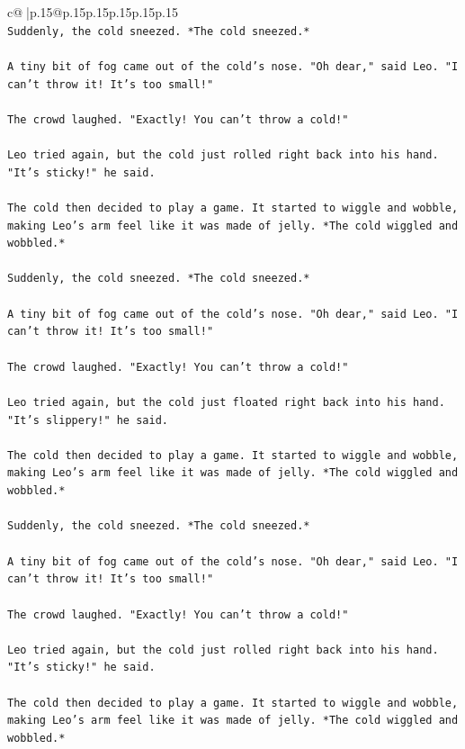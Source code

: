 \documentclass{article}
\begin{document}
{\begin{supertabular}{c@{$\;$}|p{.15\linewidth}@{}p{.15\linewidth}p{.15\linewidth}p{.15\linewidth}p{.15\linewidth}p{.15\linewidth}}
{{{\\ 
\texttt{Suddenly, the cold sneezed. *The cold sneezed.*} \\
\\ 
\texttt{A tiny bit of fog came out of the cold's nose. "Oh dear," said Leo. "I can't throw it! It's too small!"} \\
\\ 
\texttt{The crowd laughed. "Exactly! You can't throw a cold!"} \\
\\ 
\texttt{Leo tried again, but the cold just rolled right back into his hand. "It's sticky!" he said.} \\
\\ 
\texttt{The cold then decided to play a game. It started to wiggle and wobble, making Leo's arm feel like it was made of jelly. *The cold wiggled and wobbled.*} \\
\\ 
\texttt{Suddenly, the cold sneezed. *The cold sneezed.*} \\
\\ 
\texttt{A tiny bit of fog came out of the cold's nose. "Oh dear," said Leo. "I can't throw it! It's too small!"} \\
\\ 
\texttt{The crowd laughed. "Exactly! You can't throw a cold!"} \\
\\ 
\texttt{Leo tried again, but the cold just floated right back into his hand. "It's slippery!" he said.} \\
\\ 
\texttt{The cold then decided to play a game. It started to wiggle and wobble, making Leo's arm feel like it was made of jelly. *The cold wiggled and wobbled.*} \\
\\ 
\texttt{Suddenly, the cold sneezed. *The cold sneezed.*} \\
\\ 
\texttt{A tiny bit of fog came out of the cold's nose. "Oh dear," said Leo. "I can't throw it! It's too small!"} \\
\\ 
\texttt{The crowd laughed. "Exactly! You can't throw a cold!"} \\
\\ 
\texttt{Leo tried again, but the cold just rolled right back into his hand. "It's sticky!" he said.} \\
\\ 
\texttt{The cold then decided to play a game. It started to wiggle and wobble, making Leo's arm feel like it was made of jelly. *The cold wiggled and wobbled.*} \\
}}}
\end{supertabular}}
\end{document}
